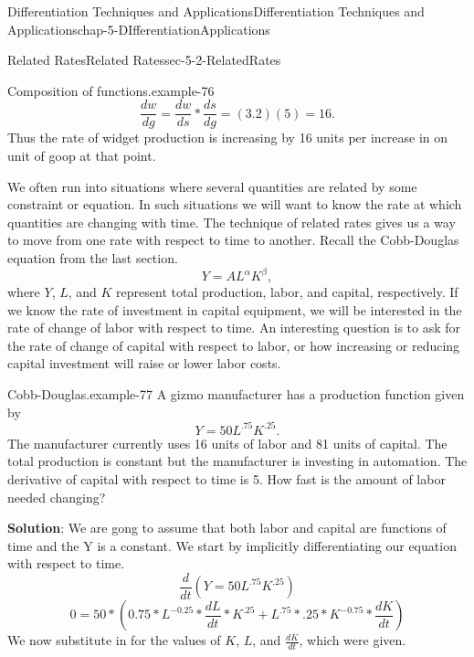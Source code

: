 \documentclass[oneside,10pt,]{book}
\newcommand{\terminology}[1]{\textbf{#1}}
\numberwithin{equation}{section}
\begin{document}
\begin{chapterptx}{Differentiation Techniques and Applications}{}{Differentiation Techniques and Applications}{}{}{chap-5-DIfferentiationApplications}
\begin{sectionptx}{Related Rates}{}{Related Rates}{}{}{sec-5-2-RelatedRates}
\begin{example}{Composition of functions.}{example-76}
\begin{equation*}
\frac{dw}{dg}  =\frac{dw}{ds}*\frac{ds}{dg}=(3.2)(5)=16.
\end{equation*}
\hypertarget{p-1964}{}%
Thus the rate of widget production is increasing by 16 units per increase in on unit of goop at that point.%
\end{example}
\hypertarget{p-1965}{}%
We often run into situations where several quantities are related by some constraint or equation.  In such situations we will want to know the rate at which quantities are changing with time.  The technique of related rates gives us a way to move from one rate with respect to time to another. Recall the Cobb-Douglas equation from the last section.%
%
\begin{equation*}
Y=AL^\alpha K^\beta,
\end{equation*}
\hypertarget{p-1966}{}%
where \(Y\), \(L\), and \(K\) represent total production, labor, and capital, respectively.  If we know the rate of investment in capital equipment, we will be interested in the rate of change of labor with respect to time.  An interesting question is to ask for the rate of change of capital with respect to labor, or how increasing or reducing capital investment will raise or lower labor costs.%
\begin{example}{Cobb-Douglas.}{example-77}%
\hypertarget{p-1967}{}%
A gizmo manufacturer has a production function given by%
%
\begin{equation*}
Y=50L^.75 K^.25.
\end{equation*}
\hypertarget{p-1968}{}%
The manufacturer currently uses 16 units of labor and 81 units of capital.  The total production is constant but the manufacturer is investing in automation.  The derivative of capital with respect to time is 5.  How fast is the amount of labor needed changing?%
\par
\hypertarget{p-1969}{}%
\terminology{Solution}: We are gong to assume that both labor and capital are functions of time and the Y is a constant.  We start by implicitly differentiating our equation with respect to time.%
%
\begin{equation*}
\frac{d}{dt}(Y=50L^.75 K^.25)
\end{equation*}
%
\begin{equation*}
0=50*(0.75*L^{-0.25}*\frac{dL}{dt}*K^{.25}+L^{.75}*.25*K^{-0.75}*\frac{dK}{dt})
\end{equation*}
\hypertarget{p-1970}{}%
We now substitute in for the values of \(K\), \(L\), and \(\frac{dK}{dt}\), which were given.%
%
\begin{equation*}

\end{equation*}
\end{example}
\end{sectionptx}
\end{chapterptx}
\end{document}
